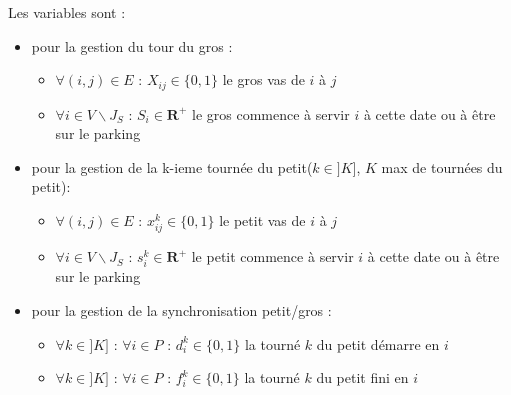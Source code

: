 \documentclass[12pt,a4paper,fleqn]{article}
\begin{document}
\clearpage
Les variables sont :
\begin{itemize}
\item pour la gestion du tour du gros :
\begin{itemize}
\item $\forall (i,j) \in E \text{ : } X_{ij} \in \{0,1\}$ le gros vas de $i$ à $j$
\item $\forall i \in V \backslash J_S \text{ : } S_i \in \mathbf{R}^+$ le gros commence à servir $i$ à cette date ou à être sur le parking
\end{itemize}
\item pour la gestion de la k-ieme tournée du petit($k \in ]K]$, $K$ max de tournées du petit):
\begin{itemize}
\item $\forall (i,j) \in E \text{ : } x_{ij}^k \in \{0,1\}$ le petit vas de $i$ à $j$
\item $\forall i \in V \backslash J_S \text{ : } s_i^k \in \mathbf{R}^+$ le petit commence à servir $i$ à cette date ou à être sur le parking
\end{itemize}
\item pour la gestion de la synchronisation petit/gros :
\begin{itemize}
\item $\forall k \in ]K] \text{ : } \forall i \in P \text{ : } d^k_i \in \{0,1\}$ la tourné $k$ du petit démarre en $i$ 
\item $\forall k \in ]K] \text{ : } \forall i \in P \text{ : } f^k_i \in \{0,1\}$ la tourné $k$ du petit fini en $i$
\end{itemize}
\end{itemize}

\clearpage
\end{document}
